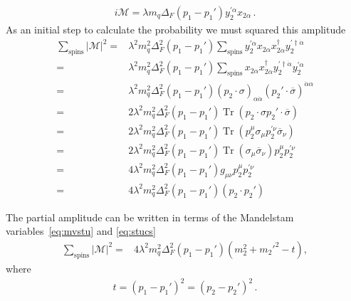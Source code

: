 \begin{align}
 i\mathcal{M}=\lambda  m_q\Delta_F(p_1-p_1')y^{\prime \alpha}_2 x_{2\alpha}\,.
\end{align}
As an initial step to calculate the probability we must squared this amplitude
\begin{align}
  \sum_{\text{spins}} |\mathcal{M}|^2=&\lambda^2   m_q^2\Delta_F^2(p_1-p_1')
     \sum_{\text{spins}} y^{\prime \alpha}_2 x_{2\alpha}x^{\dagger}_{2\dot{\alpha}} y^{\prime\dagger\dot{\alpha}}_2     \nonumber\\
=&\lambda^2   m_q^2\Delta_F^2(p_1-p_1')
     \sum_{\text{spins}}  x_{2\alpha}x^{\dagger}_{2\dot{\alpha}} y^{\prime\dagger\dot{\alpha}}_2 y^{\prime \alpha}_2     \nonumber\\
=&\lambda^2   m_q^2\Delta_F^2(p_1-p_1')
   \left( p_2\cdot \sigma \right)_{\alpha\dot{\alpha}} \left( p_2'\cdot \overline{\sigma} \right)^{\dot{\alpha}\alpha}      \nonumber\\
  =& 2 \lambda^2 m_q^2\Delta_F^2(p_1-p_1') \operatorname{Tr}\left( p_2\cdot \sigma p_2'\cdot \overline{\sigma} \right) \nonumber\\
  =& 2 \lambda^2 m_q^2\Delta_F^2(p_1-p_1') \operatorname{Tr}\left( p_2^{\mu} \sigma_{\mu} p_2^{\prime \nu} \overline{\sigma}_{\nu} \right) \nonumber\\
  =& 2 \lambda^2 m_q^2\Delta_F^2(p_1-p_1')\operatorname{Tr}\left(  \sigma_{\mu}  \overline{\sigma}_{\nu} \right) p_2^{\mu} p_2^{\prime \nu}\nonumber\\
  =& 4 \lambda^2 m_q^2\Delta_F^2(p_1-p_1') g_{\mu\nu} p_2^{\mu} p_2^{\prime \nu}\nonumber\\
  =& 4 \lambda^2 m_q^2\Delta_F^2(p_1-p_1') \left( p_2\cdot p_2' \right) 
\end{align}

The partial amplitude can be written in terms of the Mandelstam variables~\eqref{eq:mvstu} and \eqref{eq:stucs}
\begin{align}
  \sum_{\text{spins}} |\mathcal{M}|^2
  =& 4 \lambda^2 m_q^2\Delta_F^2(p_1-p_1') 
     \left( m_2^2+{m_2'}^2-t \right),
\end{align}
where
\begin{align}
  t=\left( p_1-p_1' \right)^2=\left( p_2-p_2' \right)^2\,.
\end{align}

